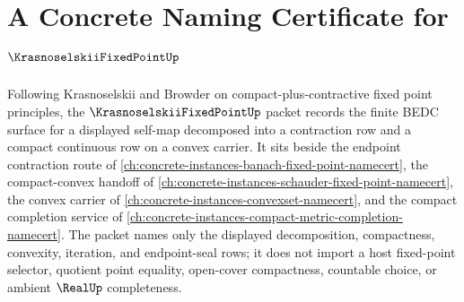 \chapter{A Concrete Naming Certificate for $\KrasnoselskiiFixedPointUp$}
\label{ch:concrete-instances-krasnoselskii-fixed-point-namecert}

Following Krasnoselskii and Browder on compact-plus-contractive fixed point
principles, the $\KrasnoselskiiFixedPointUp$ packet records the finite BEDC
surface for a displayed self-map decomposed into a contraction row and a compact
continuous row on a convex carrier. It sits beside the endpoint contraction
route of \autoref{ch:concrete-instances-banach-fixed-point-namecert}, the
compact-convex handoff of \autoref{ch:concrete-instances-schauder-fixed-point-namecert},
the convex carrier of \autoref{ch:concrete-instances-convexset-namecert}, and
the compact completion service of
\autoref{ch:concrete-instances-compact-metric-completion-namecert}. The packet
names only the displayed decomposition, compactness, convexity, iteration, and
endpoint-seal rows; it does not import a host fixed-point selector, quotient
point equality, open-cover compactness, countable choice, or ambient
$\RealUp$ completeness.

